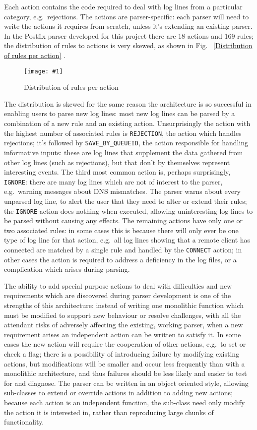 \documentclass[draft]{svmult}
\newcommand{\showgraph}[3]{%
    \begin{figure}[hbt!]
        \caption{#2}\label{#3}
        \texttt{[image: \#1]}
    \end{figure}
}
\newcommand{\refwithpage}[1]{%
    \empty{}\vref{#1}%
}
\newcommand{\numberOFrules}[0]{%
    169%
}
\newcommand{\numberOFactions}[0]{%
    18%
}
\begin{document}
Each action contains the code required to deal with log lines from a
particular category, e.g.\ rejections.  The actions are parser-specific:
each parser will need to write the actions it requires from scratch, unless
it's extending an existing parser.  In the Postfix parser developed for
this project there are \numberOFactions{} actions and \numberOFrules{}
rules; the distribution of rules to actions is very skewed, as shown in
Fig.~\refwithpage{Distribution of rules per action}.
\showgraph{build/plot-action-distribution}{Distribution of rules per
action}{Distribution of rules per action} The distribution is skewed for
the same reason the architecture is so successful in enabling users to
parse new log lines: most new log lines can be parsed by a combination of a
new rule and an existing action.  Unsurprisingly the action with the
highest number of associated rules is \texttt{REJECTION}, the action which
handles rejections; it's followed by \texttt{SAVE\_BY\_QUEUEID}, the action
responsible for handling informative inputs: these are log lines that
supplement the data gathered from other log lines (such as rejections), but
that don't by themselves represent interesting events.  The third most
common action is, perhaps surprisingly, \texttt{IGNORE}: there are many log
lines which are not of interest to the parser, e.g.\ warning messages about
DNS mismatches.  The parser warns about every unparsed log line, to alert
the user that they need to alter or extend their rules; the \texttt{IGNORE}
action does nothing when executed, allowing uninteresting log lines to be
parsed without causing any effects.  The remaining actions have only one or
two associated rules: in some cases this is because there will only ever be
one type of log line for that action, e.g.\ all log lines showing that a
remote client has connected are matched by a single rule and handled by the
\texttt{CONNECT} action; in other cases the action is required to address a
deficiency in the log files, or a complication which arises during parsing.

The ability to add special purpose actions to deal with difficulties and
new requirements which are discovered during parser development is one of
the strengths of this architecture: instead of writing one monolithic
function which must be modified to support new behaviour or resolve
challenges, with all the attendant risks of adversely affecting the
existing, working parser, when a new requirement arises an independent
action can be written to satisfy it.  In some cases the new action will
require the cooperation of other actions, e.g.\ to set or check a flag;
there is a possibility of introducing failure by modifying existing
actions, but modifications will be smaller and occur less frequently than
with a monolithic architecture, and thus failures should be less likely and
easier to test for and diagnose.  The parser can be written in an object
oriented style, allowing sub-classes to extend or override actions in
addition to adding new actions; because each action is an independent
function, the sub-class need only modify the action it is interested in,
rather than reproducing large chunks of functionality.
\end{document}
